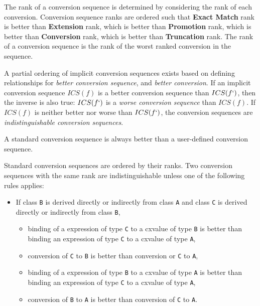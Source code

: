 \p The rank of a conversion sequence is determined by considering the rank of
each conversion. Conversion sequence ranks are ordered such that \textbf{Exact
Match} rank is better than \textbf{Extension} rank, which is better than
\textbf{Promotion} rank, which is better than \textbf{Conversion} rank, which is
better than \textbf{Truncation} rank. The rank of a conversion sequence is the
rank of the worst ranked conversion in the sequence.



\p A partial ordering of implicit conversion sequences exists based on defining
relationships for \textit{better conversion sequence}, and \textit{better
conversion}. If an implicit conversion sequence \(ICS(f)\) is a better
conversion sequence than \(ICS(f`)\), then the inverse is also true: \(ICS(f`)\)
is a \textit{worse conversion sequence} than \(ICS(f)\). If \(ICS(f)\) is
neither better nor worse than \(ICS(f`)\), the conversion sequences are
\textit{indistinguishable conversion sequences}.

\p A standard conversion sequence is always better than a user-defined
conversion sequence.

\p Standard conversion sequences are ordered by their ranks. Two conversion
sequences with the same rank are indistinguishable unless one of the following
rules applies:

\begin{itemize}
  \item If class \texttt{B} is derived directly or indirectly from class
  \texttt{A} and class \texttt{C} is derived directly or indirectly from class
  \texttt{B},
  \begin{itemize}
    \item binding of a expression of type \texttt{C} to a cxvalue of type
    \texttt{B} is better than binding an expression of type \texttt{C} to a
    cxvalue of type \texttt{A},
    \item conversion of \texttt{C} to \texttt{B} is better than conversion or
    \texttt{C} to \texttt{A},
    \item binding of a expression of type \texttt{B} to a cxvalue of type
    \texttt{A} is better than binding an expression of type \texttt{C} to a
    cxvalue of type \texttt{A},
    \item conversion of \texttt{B} to \texttt{A} is better than conversion of
    \texttt{C} to \texttt{A}.
  \end{itemize}
\end{itemize}
